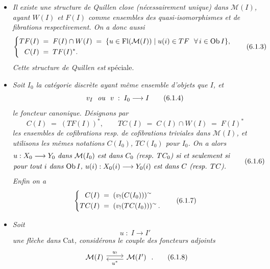 \begin{itemize}[leftmargin=2.5em]
\item[a)] \textit{Il existe une structure de Quillen close (nécessairement unique) dans $\mathcal{M}(I)$, ayant $W(I)$ et $F(I)$ comme ensembles des quasi-isomorphismes et de fibrations respectivement. On a donc aussi}
\[
\left\{
\begin{aligned}
TF(I) \;&=\; F(I)\cap W(I) \;=\; \{u\in \operatorname{Fl}(\mathcal{M}(I)) \mid u(i)\in TF \ \ \forall\, i\in \operatorname{Ob} I\},\\
C(I) \;&=\; TF(I)^{*}.
\end{aligned}
\right.
\tag*{(6.1.3)}
\]
\textit{Cette structure de Quillen est} spéciale.

\item[b)] \textit{Soit $I_0$ la catégorie discrète ayant même ensemble d'objets que $I$, et}
\[
v_I \ \ \text{\textit{ou}}\ \ v \;:\; I_0 \longrightarrow I
\tag*{(6.1.4)}
\]
\textit{le foncteur canonique. Désignons par}
\[
C(I) \;=\; (TF(I))^{*}, \qquad TC(I) \;=\; C(I)\cap W(I) \;=\; F(I)^{*}
\tag*{(6.1.5)}
\]
\textit{les ensembles de cofibrations resp. de cofibrations triviales dans $\mathcal{M}(I)$, et utilisons les mêmes notations $C(I_0)$, $TC(I_0)$ pour $I_0$. On a alors}
\[
\begin{aligned}
&\text{\textit{$u : X_0 \longrightarrow Y_0$ dans $\mathcal{M}(I_0)$ est dans $C_0$ (resp. $TC_0$) si et seulement si}}\\
&\text{\textit{pour tout $i$ dans $\operatorname{Ob} I$, $u(i) : X_0(i) \longrightarrow Y_0(i)$ est dans $C$ (resp. $TC$).}}
\end{aligned}
\tag*{(6.1.6)}
\]
\textit{Enfin on a}
\[
\left\{
\begin{aligned}
C(I) \;&=\; (v_!(C(I_0)))\tl\\
TC(I) \;&=\; (v_!(TC(I_0)))\tl\,.
\end{aligned}
\right.
\tag*{(6.1.7)} %
\]

\item[c)] \textit{Soit}
\[
u \;:\; I \longrightarrow I'
\]
\textit{une flèche dans} Cat\textit{, considérons le couple des foncteurs adjoints}
\[
\begin{tikzcd}
\mathcal{M}(I) \arrow[r, shift left, "u_!"] & \mathcal{M}(I') \arrow[l, shift left, "u^{*}"]
\end{tikzcd}
\;.
\tag*{(6.1.8)}
\]



\end{itemize}
